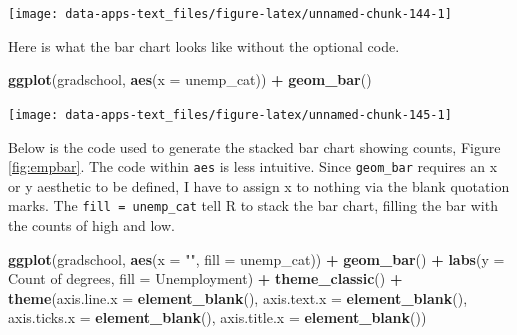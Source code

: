 \documentclass[
]{book}
\makeatletter
\newenvironment{Shaded}{\begin{snugshade}}{\end{snugshade}}
\newcommand{\AttributeTok}[1]{\textcolor[rgb]{0.27,0.27,0.27}{#1}}
\newcommand{\FunctionTok}[1]{\textcolor[rgb]{0.27,0.27,0.27}{\textbf{#1}}}
\newcommand{\NormalTok}[1]{#1}
\newcommand{\SpecialCharTok}[1]{\textcolor[rgb]{0.43,0.43,0.43}{\textbf{#1}}}
\newcommand{\StringTok}[1]{\textcolor[rgb]{0.5,0.5,0.5}{#1}}
\newenvironment{kframe}{%
\medskip{}
\setlength{\fboxsep}{.8em}
 \def\at@end@of@kframe{}%
 \ifinner\ifhmode%
  \def\at@end@of@kframe{\end{minipage}}%
  \begin{minipage}{\columnwidth}%
 \fi\fi%
 \def\FrameCommand##1{\hskip\@totalleftmargin \hskip-\fboxsep
 \colorbox{shadecolor}{##1}\hskip-\fboxsep
     \hskip-\linewidth \hskip-\@totalleftmargin \hskip\columnwidth}%
 \MakeFramed {\advance\hsize-\width
   \@totalleftmargin\z@ \linewidth\hsize
   \@setminipage}}%
 {\par\unskip\endMakeFramed%
 \at@end@of@kframe}
\renewenvironment{Shaded}{\begin{kframe}}{\end{kframe}}
\makeatother
\begin{document}
\begin{center}\texttt{[image: data-apps-text\_files/figure-latex/unnamed-chunk-144-1]} \end{center}

Here is what the bar chart looks like without the optional code.

\begin{Shaded}
\begin{Highlighting}[]
\FunctionTok{ggplot}\NormalTok{(gradschool, }\FunctionTok{aes}\NormalTok{(}\AttributeTok{x =}\NormalTok{ unemp\_cat)) }\SpecialCharTok{+}
  \FunctionTok{geom\_bar}\NormalTok{()}
\end{Highlighting}
\end{Shaded}

\begin{center}\texttt{[image: data-apps-text\_files/figure-latex/unnamed-chunk-145-1]} \end{center}

Below is the code used to generate the stacked bar chart showing counts, Figure \ref{fig:empbar}. The code within \texttt{aes} is less intuitive. Since \texttt{geom\_bar} requires an x or y aesthetic to be defined, I have to assign x to nothing via the blank quotation marks. The \texttt{fill\ =\ unemp\_cat} tell R to stack the bar chart, filling the bar with the counts of high and low.

\begin{Shaded}
\begin{Highlighting}[]
\FunctionTok{ggplot}\NormalTok{(gradschool, }\FunctionTok{aes}\NormalTok{(}\AttributeTok{x =} \StringTok{""}\NormalTok{, }\AttributeTok{fill =}\NormalTok{ unemp\_cat)) }\SpecialCharTok{+}
  \FunctionTok{geom\_bar}\NormalTok{() }\SpecialCharTok{+}
  \FunctionTok{labs}\NormalTok{(}\AttributeTok{y =} \StringTok{\textquotesingle{}Count of degrees\textquotesingle{}}\NormalTok{,}
       \AttributeTok{fill =} \StringTok{\textquotesingle{}Unemployment\textquotesingle{}}\NormalTok{) }\SpecialCharTok{+}
  \FunctionTok{theme\_classic}\NormalTok{() }\SpecialCharTok{+}
  \FunctionTok{theme}\NormalTok{(}\AttributeTok{axis.line.x =} \FunctionTok{element\_blank}\NormalTok{(),}
        \AttributeTok{axis.text.x =} \FunctionTok{element\_blank}\NormalTok{(),}
        \AttributeTok{axis.ticks.x =} \FunctionTok{element\_blank}\NormalTok{(),}
        \AttributeTok{axis.title.x =} \FunctionTok{element\_blank}\NormalTok{())}
\end{Highlighting}
\end{Shaded}
\end{document}
